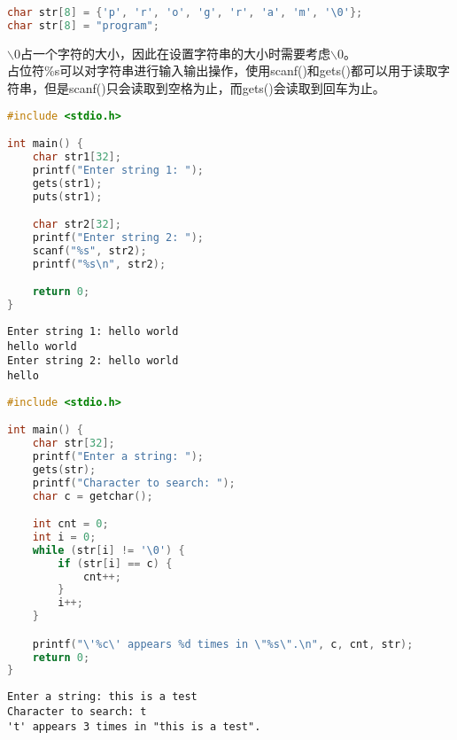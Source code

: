 \begin{lstlisting}[language=C]
char str[8] = {'p', 'r', 'o', 'g', 'r', 'a', 'm', '\0'};
char str[8] = "program";
\end{lstlisting}

$ \backslash $0占一个字符的大小，因此在设置字符串的大小时需要考虑$ \backslash $0。\\

占位符\%s可以对字符串进行输入输出操作，使用scanf()和gets()都可以用于读取字符串，但是scanf()只会读取到空格为止，而gets()会读取到回车为止。\\


\begin{lstlisting}[language=C]
#include <stdio.h>

int main() {
	char str1[32];
	printf("Enter string 1: ");
	gets(str1);
	puts(str1);

	char str2[32];
	printf("Enter string 2: ");
	scanf("%s", str2);
	printf("%s\n", str2);

	return 0;
}
\end{lstlisting}

\begin{tcolorbox}
	\begin{verbatim}
Enter string 1: hello world
hello world
Enter string 2: hello world
hello
	\end{verbatim}
\end{tcolorbox}

\vspace{0.5cm}


\begin{lstlisting}[language=C]
#include <stdio.h>

int main() {
	char str[32];
	printf("Enter a string: ");
	gets(str);
	printf("Character to search: ");
	char c = getchar();

	int cnt = 0;
	int i = 0;
	while (str[i] != '\0') {
		if (str[i] == c) {
			cnt++;
		}
		i++;
	}

	printf("\'%c\' appears %d times in \"%s\".\n", c, cnt, str);
	return 0;
}
\end{lstlisting}

\begin{tcolorbox}
	\begin{verbatim}
Enter a string: this is a test
Character to search: t
't' appears 3 times in "this is a test".
	\end{verbatim}
\end{tcolorbox}

